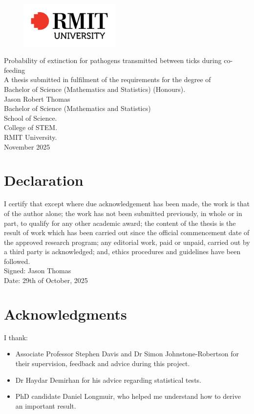 \documentclass{article}
\begin{document}
\begin{titlepage}
\begin{figure}[t!]
\centering
\includegraphics[width=5cm]{rmit-logo}
\end{figure}

\vspace*{2cm}

\begin{center}
{\large
	Probability of extinction for pathogens transmitted between ticks during co-feeding\\
	[1cm]
	A thesis submitted in fulfilment of the requirements for the degree of \\
    Bachelor of Science (Mathematics and Statistics) (Honours).\\
	[2cm]
	Jason Robert Thomas\\
	[0.5cm]
	Bachelor of Science (Mathematics and Statistics) \\
	[3cm]
	School of Science.\\
	[0.5cm]
	College of STEM.\\
	[0.5cm]
	RMIT University.\\
	[2cm]
	November 2025\\
}
\end{center}
	
\end{titlepage}


\section*{Declaration}
I certify that except where due acknowledgement has been made, the work is that of the author alone; the work has not been submitted previously, in whole or in part, to qualify for any other academic award; the content of the thesis is the result of work which has been carried out since the official commencement date of the approved research program; any editorial work, paid or unpaid, carried out by a third party is acknowledged; and, ethics procedures and guidelines have been followed. \\
[1cm]
Signed: Jason Thomas\\
[1cm]
Date: 29th of October, 2025\\

\section*{Acknowledgments}
I thank:
\begin{itemize}
\item Associate Professor Stephen Davis and Dr Simon Johnstone-Robertson for their supervision, feedback and advice during this project.
\item Dr Haydar Demirhan for his advice regarding statistical tests.
\item PhD candidate Daniel Longmuir, who helped me understand how to derive an important result.
\end{itemize}
\end{document}
